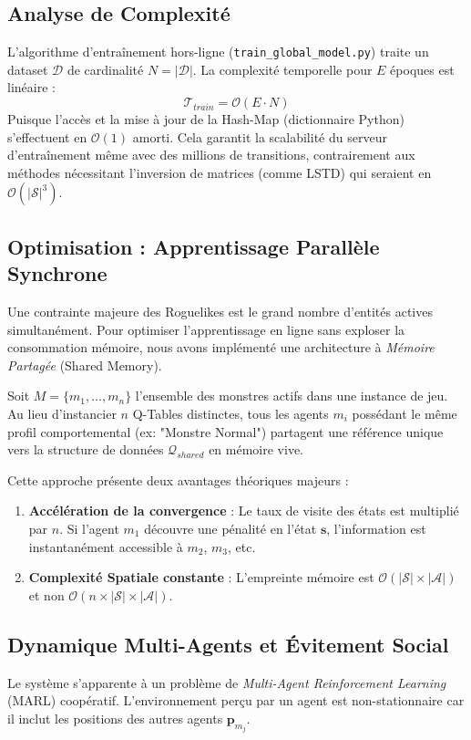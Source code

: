 \documentclass[12pt,a4paper]{article}
\newcommand{\state}{\mathbf{s}}
\begin{document}
\subsection{Analyse de Complexité}
L'algorithme d'entraînement hors-ligne (\texttt{train\_global\_model.py}) traite un dataset $\mathcal{D}$ de cardinalité $N = |\mathcal{D}|$.
La complexité temporelle pour $E$ époques est linéaire :
\begin{equation}
    \mathcal{T}_{train} = \mathcal{O}(E \cdot N)
\end{equation}
Puisque l'accès et la mise à jour de la Hash-Map (dictionnaire Python) s'effectuent en $\mathcal{O}(1)$ amorti. Cela garantit la scalabilité du serveur d'entraînement même avec des millions de transitions, contrairement aux méthodes nécessitant l'inversion de matrices (comme LSTD) qui seraient en $\mathcal{O}(|\mathcal{S}|^3)$.

\subsection{Optimisation : Apprentissage Parallèle Synchrone}
Une contrainte majeure des Roguelikes est le grand nombre d'entités actives simultanément. Pour optimiser l'apprentissage en ligne sans exploser la consommation mémoire, nous avons implémenté une architecture à \textit{Mémoire Partagée} (Shared Memory).

Soit $M = \{m_1, \dots, m_n\}$ l'ensemble des monstres actifs dans une instance de jeu. Au lieu d'instancier $n$ Q-Tables distinctes, tous les agents $m_i$ possédant le même profil comportemental (ex: "Monstre Normal") partagent une référence unique vers la structure de données $\mathcal{Q}_{shared}$ en mémoire vive.

Cette approche présente deux avantages théoriques majeurs :
\begin{enumerate}
    \item \textbf{Accélération de la convergence} : Le taux de visite des états est multiplié par $n$. Si l'agent $m_1$ découvre une pénalité en l'état $\state$, l'information est instantanément accessible à $m_2$, $m_3$, etc.
    \item \textbf{Complexité Spatiale constante} : L'empreinte mémoire est $\mathcal{O}(|\mathcal{S}| \times |\mathcal{A}|)$ et non $\mathcal{O}(n \times |\mathcal{S}| \times |\mathcal{A}|)$.
\end{enumerate}

\subsection{Dynamique Multi-Agents et Évitement Social}
Le système s'apparente à un problème de \textit{Multi-Agent Reinforcement Learning} (MARL) coopératif. L'environnement perçu par un agent est non-stationnaire car il inclut les positions des autres agents $\mathbf{p}_{m_j}$.
\end{document}
